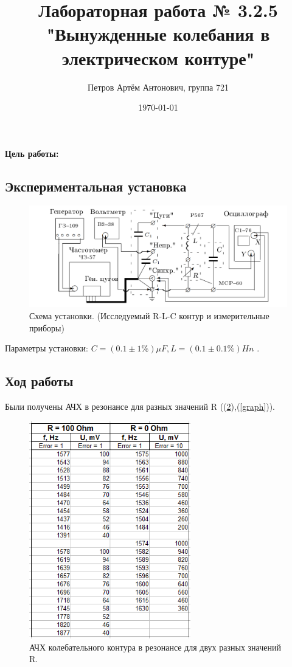 \documentclass[a4paper,12pt]{article}
\author{Петров Артём Антонович, группа 721}
\title{Лабораторная работа № 3.2.5 "Вынужденные колебания в электрическом контуре"}
\date{\today}
\begin{document}

\begin{minipage}[t][5cm]{\textwidth}
\maketitle
\end{minipage}


\textbf{Цель работы:} 
\bigskip


\subsection*{Экспериментальная установка}
\bigskip


\begin{figure}[ht]
\centering
\includegraphics[width=150mm]{scheme.png}
\caption{Схема установки. (Исследуемый R-L-C контур и измерительные приборы)}\label{scheme.png}
\end{figure}

Параметры установки: $ C = (0.1 \pm 1\%)\mu F, L = (0.1\pm0.1\%)Hn $ .

\bigskip

\subsection*{Ход работы}
\bigskip

Были получены АЧХ в резонансе для разных значений R ((\ref{tbale1}),(\ref{graph})). 

\begin{figure}[h!]
\centering
\includegraphics[width=70mm]{table1.png}
\caption{АЧХ колебательного контура в резонансе для двух разных значений R.}\label{tbale1}
\end{figure}
\end{document}
